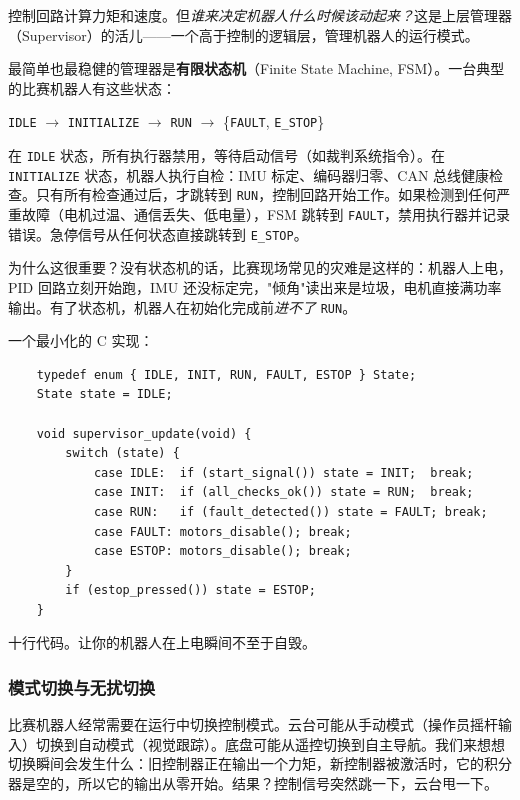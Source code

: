 控制回路计算力矩和速度。但\textit{谁来决定机器人什么时候该动起来？}这是上层管理器（Supervisor）的活儿——一个高于控制的逻辑层，管理机器人的运行模式。

最简单也最稳健的管理器是\textbf{有限状态机}（Finite State Machine, FSM）。一台典型的比赛机器人有这些状态：

\begin{center}
\texttt{IDLE} $\to$ \texttt{INITIALIZE} $\to$ \texttt{RUN} $\to$ \{\texttt{FAULT}, \texttt{E\_STOP}\}
\end{center}

在 \texttt{IDLE} 状态，所有执行器禁用，等待启动信号（如裁判系统指令）。在 \texttt{INITIALIZE} 状态，机器人执行自检：IMU 标定、编码器归零、CAN 总线健康检查。只有所有检查通过后，才跳转到 \texttt{RUN}，控制回路开始工作。如果检测到任何严重故障（电机过温、通信丢失、低电量），FSM 跳转到 \texttt{FAULT}，禁用执行器并记录错误。急停信号从任何状态直接跳转到 \texttt{E\_STOP}。

为什么这很重要？没有状态机的话，比赛现场常见的灾难是这样的：机器人上电，PID 回路立刻开始跑，IMU 还没标定完，"倾角"读出来是垃圾，电机直接满功率输出。有了状态机，机器人在初始化完成前\textit{进不了} \texttt{RUN}。

一个最小化的 C 实现：

\begin{verbatim}
    typedef enum { IDLE, INIT, RUN, FAULT, ESTOP } State;
    State state = IDLE;

    void supervisor_update(void) {
        switch (state) {
            case IDLE:  if (start_signal()) state = INIT;  break;
            case INIT:  if (all_checks_ok()) state = RUN;  break;
            case RUN:   if (fault_detected()) state = FAULT; break;
            case FAULT: motors_disable(); break;
            case ESTOP: motors_disable(); break;
        }
        if (estop_pressed()) state = ESTOP;
    }
\end{verbatim}

十行代码。让你的机器人在上电瞬间不至于自毁。

\subsubsection{模式切换与无扰切换}

比赛机器人经常需要在运行中切换控制模式。云台可能从手动模式（操作员摇杆输入）切换到自动模式（视觉跟踪）。底盘可能从遥控切换到自主导航。我们来想想切换瞬间会发生什么：旧控制器正在输出一个力矩，新控制器被激活时，它的积分器是空的，所以它的输出从零开始。结果？控制信号突然跳一下，云台甩一下。

